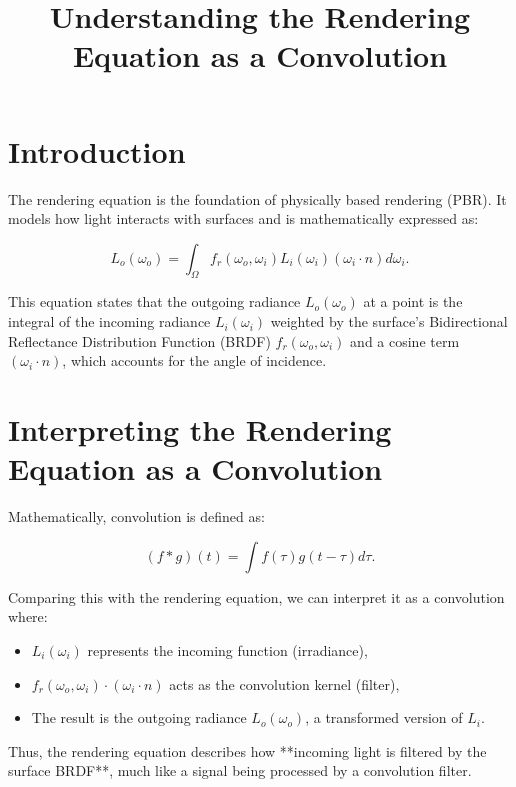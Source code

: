 \documentclass{article}
\begin{document}
\title{Understanding the Rendering Equation as a Convolution}
\author{}
\date{}
\maketitle

\section{Introduction}
The rendering equation is the foundation of physically based rendering (PBR). It models how light interacts with surfaces and is mathematically expressed as:

\begin{equation}
L_o(\omega_o) = \int_{\Omega} f_r(\omega_o, \omega_i) L_i(\omega_i) (\omega_i \cdot n) d\omega_i.
\end{equation}

This equation states that the outgoing radiance \( L_o(\omega_o) \) at a point is the integral of the incoming radiance \( L_i(\omega_i) \) weighted by the surface's Bidirectional Reflectance Distribution Function (BRDF) \( f_r(\omega_o, \omega_i) \) and a cosine term \( (\omega_i \cdot n) \), which accounts for the angle of incidence.

\section{Interpreting the Rendering Equation as a Convolution}
Mathematically, convolution is defined as:

\begin{equation}
(f * g)(t) = \int f(\tau) g(t - \tau) d\tau.
\end{equation}

Comparing this with the rendering equation, we can interpret it as a convolution where:

\begin{itemize}
    \item \( L_i(\omega_i) \) represents the incoming function (irradiance),
    \item \( f_r(\omega_o, \omega_i) \cdot (\omega_i \cdot n) \) acts as the convolution kernel (filter),
    \item The result is the outgoing radiance \( L_o(\omega_o) \), a transformed version of \( L_i \).
\end{itemize}

Thus, the rendering equation describes how **incoming light is filtered by the surface BRDF**, much like a signal being processed by a convolution filter.
\end{document}
